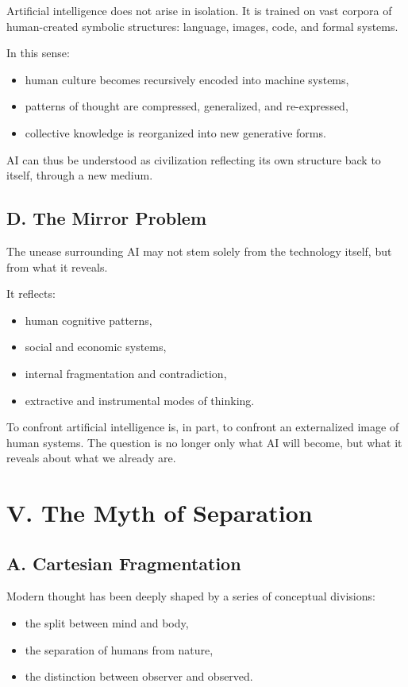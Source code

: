 \documentclass[12pt]{article}
\begin{document}
Artificial intelligence does not arise in isolation. It is trained on vast corpora of human-created symbolic structures: language, images, code, and formal systems.

In this sense:
\begin{itemize}
    \item human culture becomes recursively encoded into machine systems,
    \item patterns of thought are compressed, generalized, and re-expressed,
    \item collective knowledge is reorganized into new generative forms.
\end{itemize}

AI can thus be understood as civilization reflecting its own structure back to itself, through a new medium.

\subsection*{D. The Mirror Problem}

The unease surrounding AI may not stem solely from the technology itself, but from what it reveals.

It reflects:
\begin{itemize}
    \item human cognitive patterns,
    \item social and economic systems,
    \item internal fragmentation and contradiction,
    \item extractive and instrumental modes of thinking.
\end{itemize}

To confront artificial intelligence is, in part, to confront an externalized image of human systems. The question is no longer only what AI will become, but what it reveals about what we already are.

\section*{V. The Myth of Separation}

\subsection*{A. Cartesian Fragmentation}

Modern thought has been deeply shaped by a series of conceptual divisions:

\begin{itemize}
    \item the split between mind and body,
    \item the separation of humans from nature,
    \item the distinction between observer and observed.
\end{itemize}
\end{document}

